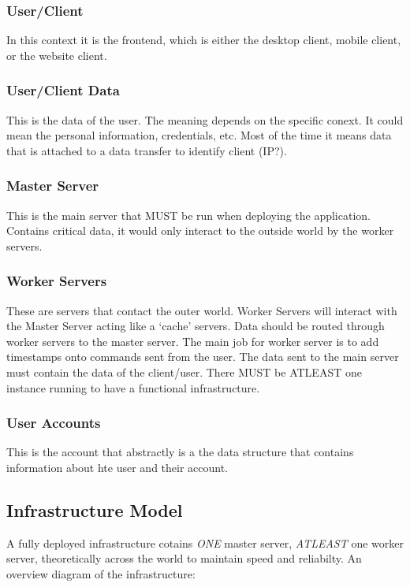 \documentclass[a4paper]{article}
\begin{document}
\subsubsection{User/Client}
In this context it is the frontend, which is either the desktop client,
mobile client, or the website client.

\subsubsection{User/Client Data}
This is the data of the user. The meaning depends on the specific conext. It
could mean the personal information, credentials, etc. Most of the time it means
data that is attached to a data transfer to identify client (IP?).

\subsubsection{Master Server}
This is the main server that MUST be run when deploying the application.
Contains critical data, it would only interact to the outside world by the
worker servers.

\subsubsection{Worker Servers}
These are servers that contact the outer world. Worker Servers will
interact with the Master Server acting like a `cache' servers. Data should be 
routed through worker servers to the master server. The main job for worker 
server is to add timestamps onto commands sent from the user. The data sent to
the main server must contain the data of the client/user. There MUST be ATLEAST
one instance running to have a functional infrastructure.

\subsubsection{User Accounts}
This is the account that abstractly is a the data structure that contains
information about hte user and their account.

\subsection{Infrastructure Model}
A fully deployed infrastructure cotains \emph{ONE} master server, 
\emph{ATLEAST} one worker server, theoretically across the world to maintain 
speed and reliabilty. An overview diagram of the infrastructure: \newline
\end{document}
